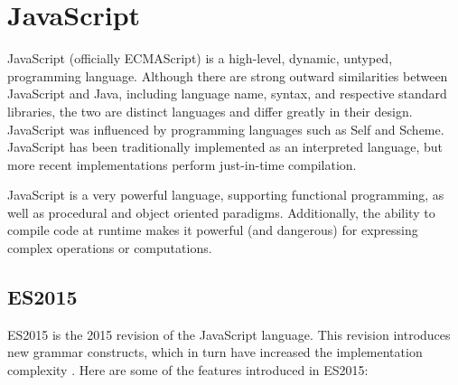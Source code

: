 \section{JavaScript}

JavaScript (officially ECMAScript) is a high-level, dynamic, untyped, programming language. Although there are strong outward similarities between JavaScript and Java, including language name, syntax, and respective standard libraries, the two are distinct languages and differ greatly in their design. JavaScript was influenced by programming languages such as Self and Scheme. JavaScript has been traditionally implemented as an interpreted language, but more recent implementations perform just-in-time compilation. \cite{javascript16}

JavaScript is a very powerful language, supporting functional programming, as well as procedural and object oriented paradigms.  Additionally, the ability to compile code at runtime makes it powerful (and dangerous) for expressing complex operations or computations. \cite{eval16} 

\subsection{ES2015}
ES2015 is the 2015 revision of the JavaScript language. This revision introduces new grammar constructs, which in turn have increased the implementation complexity \cite{arrowfn16} \cite{let16} \cite{destructuring16}.  Here are  some of the features introduced in ES2015:

